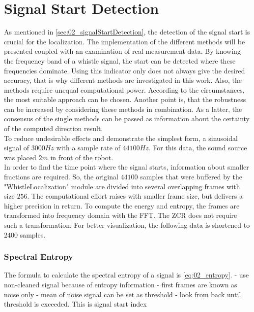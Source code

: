 \section{Signal Start Detection}
\label{sec:03_signalStartDetection}

As mentioned in \ref{sec:02_signalStartDetection}, the detection of the
signal start is crucial for the localization.
The implementation of the different methods will be presented coupled with
an examination of real measurement data. By knowing the frequency band
of a whistle signal, the start can be detected where these frequencies dominate.
Using this indicator only does not always give the desired accuracy, that is why
different methods are investigated in this work. Also, the methods require
unequal computational power. According to the circumstances, the most suitable
approach can be chosen.
Another point is, that the robustness can be increased by considering these methods
in combination.
As a latter, the consensus of the single methods can be passed as information
about the certainty of the computed direction result.
\\
To reduce undesirable effects and demonstrate the simplest form, a sinusoidal
signal of $3000\si{Hz}$ with a sample rate of $44100\si{Hz}$. For this
data, the sound source was placed $2\si{m}$ in front of the robot.
\\
In order to find the time point where the signal starts, information about
smaller fractions are required.
So, the original $44100$ samples that were buffered by the
"WhistleLocalization" module are divided into several overlapping
frames with size $256$. The computational effort raises with smaller frame size,
but delivers a higher precision in return.
To compute the energy and entropy, the frames are transformed into
frequency domain with the \ac{FFT}.
The \ac{ZCR} does not require such a transformation.
For better visualization, the following data is shortened to $2400$ samples.


\subsubsection*{Spectral Entropy}

The formula to calculate the spectral entropy of a signal is \ref{eq:02_entropy}.
- use non-cleaned signal because of entropy information
- first frames are known as noise only
- mean of noise signal can be set as threshold
- look from back until threshold is exceeded. This is signal start index


